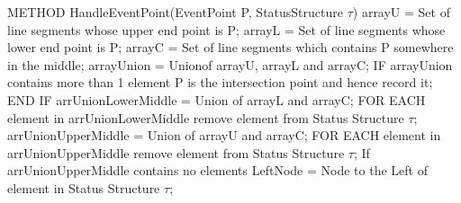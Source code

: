 \noindent
\newline METHOD HandleEventPoint(EventPoint P, StatusStructure $\tau$)
    \newline \hspace*{2em} arrayU = Set of line segments whose upper end point is P;
    \newline \hspace*{2em} arrayL = Set of line segments whose lower end point is P;
    \newline \hspace*{2em} arrayC = Set of line segments which contains P somewhere in the middle; \newline
    \newline \hspace*{2em} arrayUnion = Unionof arrayU, arrayL and arrayC; \newline
    \newline \hspace*{2em} IF arrayUnion contains more than 1 element
        \newline \hspace*{4em} P is the intersection point and hence  record it;
    \newline \hspace*{2em} END IF \newline
    \newline \hspace*{2em} arrUnionLowerMiddle = Union of arrayL and arrayC;
    \newline \hspace*{2em} FOR EACH element in arrUnionLowerMiddle
        \newline \hspace*{4em} remove element from Status Structure $\tau$;
    \newline \hspace*{2em} arrUnionUpperMiddle = Union of arrayU and arrayC;
    \newline \hspace*{2em} FOR EACH element in arrUnionUpperMiddle
        \newline \hspace*{4em} remove element from Status Structure $\tau$; \newline
    \newline \hspace*{2em} If arrUnionUpperMiddle contains no elements
        \newline \hspace*{4em} LeftNode = Node to the Left of element in Status Structure $\tau$;
